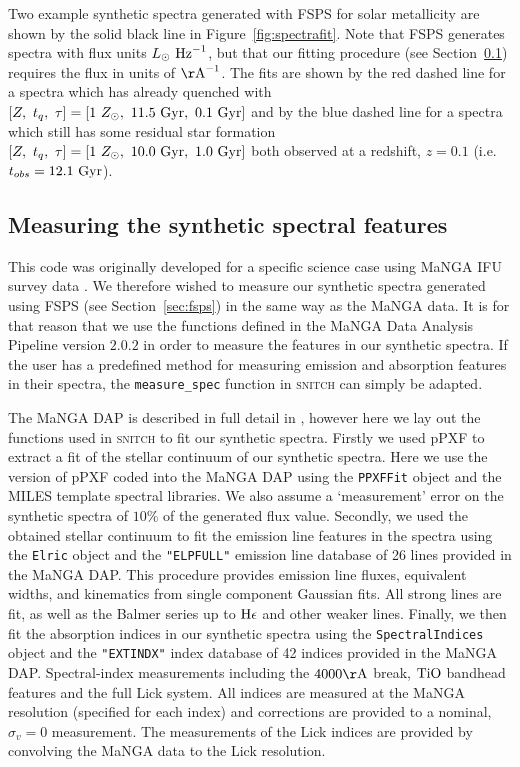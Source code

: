 \documentclass[useAMS,usenatbib]{mn2e}
\begin{document}
Two example synthetic spectra generated with FSPS for solar metallicity are shown by the solid black line in Figure~\ref{fig:spectrafit}. Note that FSPS generates spectra with flux units $L_{\odot}~\rm{Hz}^{-1}$, but that our fitting procedure (see Section~\ref{sec:dap}) requires the flux in units of $\rm{\AA}^{-1}$. The fits are shown by the red dashed line for a spectra which has already quenched with $[Z,~t_q,~\tau] = [1~Z_{\odot},~11.5~\rm{Gyr},~0.1~\rm{Gyr}]$ and by the blue dashed line for a spectra which still has some residual star formation $[Z,~t_q,~\tau] = [1~Z_{\odot},~10.0~\rm{Gyr},~1.0~\rm{Gyr}]$ both observed at a redshift, $z=0.1$ (i.e. $t_{obs}=12.1~\rm{Gyr}$). 

\subsection{Measuring the synthetic spectral features}\label{sec:dap}

This code was originally developed for a specific science case using MaNGA IFU survey data \citep[an integral-field spectroscopic survey of 10,000 galaxies undertaken by the fourth phase of the Sloan Digital Sky Survey, SDSS-IV; ][]{bundy15}. We therefore wished to measure our synthetic spectra generated using FSPS (see Section~\ref{sec:fsps}) in the same way as the MaNGA data. It is for that reason that we use the functions defined in the MaNGA Data Analysis Pipeline \citep[DAP;][]{westfall18} version $2.0.2$ in order to measure the features in our synthetic spectra. If the user has a predefined method for measuring emission and absorption features in their spectra, the \texttt{measure\_spec} function in \textsc{snitch} can simply be adapted.

The MaNGA DAP is described in full detail in \cite{westfall18}, however here we lay out the functions used in \textsc{snitch} to fit our synthetic spectra. Firstly we used pPXF \citep{cappellari04} to extract a fit of the stellar continuum of our synthetic spectra. Here we use the version of pPXF coded into the MaNGA DAP using the \texttt{PPXFFit} object and the MILES template spectral libraries. We also assume a `measurement' error on the synthetic spectra of $10\%$ of the generated flux value. Secondly, we used the obtained stellar continuum to fit the emission line features in the spectra using the \texttt{Elric} object and the \texttt{"ELPFULL"} emission line database of 26 lines provided in the MaNGA DAP. This procedure provides emission line fluxes, equivalent widths, and kinematics from single component Gaussian fits. All strong lines are fit, as well as the Balmer series up to $\rm{H}\epsilon$ and other weaker lines. Finally, we then fit the absorption indices in our synthetic spectra using the \texttt{SpectralIndices} object and the \texttt{"EXTINDX"} index database of 42 indices provided in the MaNGA DAP. Spectral-index measurements including the $4000\rm{\AA}$ break, $\rm{TiO}$ bandhead features and the full Lick system. All indices are measured at the MaNGA resolution (specified for each index) and corrections are provided to a nominal, $\sigma_v = 0$ measurement. The measurements of the Lick indices are provided by convolving the MaNGA data to the Lick resolution. 
\end{document}
